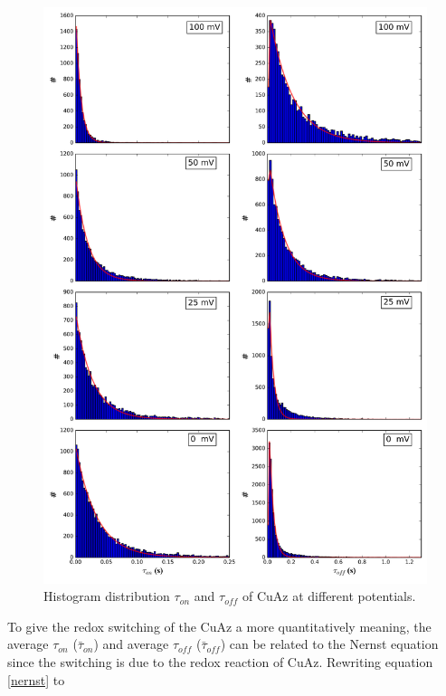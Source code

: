 \documentclass[twoside,single]{lion-msc}
\begin{document}
\begin{figure}[ht!]
\centering
\includegraphics[width=.9\textwidth]{histograms_thesis}
\caption{Histogram distribution $\tau_{on}$ and $\tau_{off}$ of CuAz at different potentials.}
\label{histograms_disc}
\end{figure}

To give the redox switching of the CuAz a more quantitatively meaning, the average $\tau_{on}$ ($\bar{\tau}_{on}$) and average $\tau_{off}$ ($\bar{\tau}_{off}$) can be related to the Nernst equation since the switching is due to the redox reaction of CuAz. Rewriting equation \ref{nernst} to 
\end{document}
